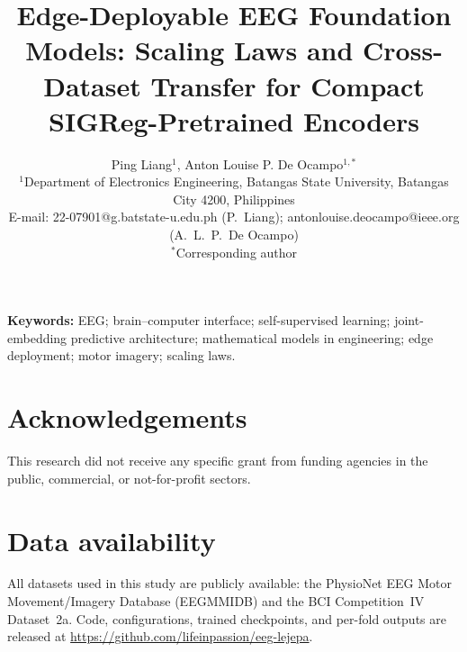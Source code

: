 \documentclass[10pt,a4paper]{article}
\begin{document}
\title{\bfseries Edge-Deployable EEG Foundation Models: Scaling Laws and Cross-Dataset Transfer for Compact SIGReg-Pretrained Encoders}
\author{%
  Ping Liang$^{1}$, Anton Louise P. De Ocampo$^{1,*}$\\[6pt]
  \normalsize $^{1}$Department of Electronics Engineering, Batangas State
  University, Batangas City 4200, Philippines\\[3pt]
  \normalsize E-mail: 22-07901@g.batstate-u.edu.ph (P.~Liang);
  antonlouise.deocampo@ieee.org (A.~L.~P.~De Ocampo)\\[3pt]
  \normalsize $^{*}$Corresponding author%
}
\date{}
\maketitle



\vspace{4pt}
\noindent\textbf{Keywords:} EEG; brain--computer interface; self-supervised learning; joint-embedding predictive architecture; mathematical models in engineering; edge deployment; motor imagery; scaling laws.









\section*{Acknowledgements}
This research did not receive any specific grant from funding agencies in the public, commercial, or not-for-profit sectors.

\section*{Data availability}
All datasets used in this study are publicly available: the PhysioNet EEG Motor Movement/Imagery Database (EEGMMIDB) and the BCI Competition~IV Dataset~2a. Code, configurations, trained checkpoints, and per-fold outputs
are released at \url{https://github.com/lifeinpassion/eeg-lejepa}.
\end{document}
